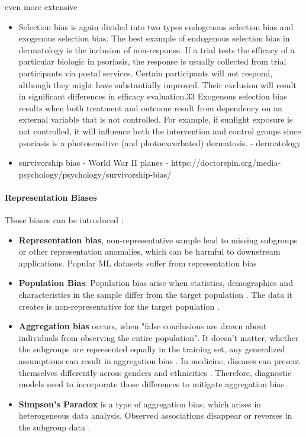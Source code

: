 \begin{refsection}
		even more extensive
		\begin{itemize}
			\item Selection bias is again divided into two types endogenous selection bias and exogenous selection bias. The best example of endogenous selection bias in dermatology is the inclusion of non-response. If a trial tests the efficacy of a particular biologic in psoriasis, the response is usually collected from trial participants via postal services. Certain participants will not respond, although they might have substantially improved. Their exclusion will result in significant differences in efficacy evaluation.33
			Exogenous selection bias results when both treatment and outcome result from dependency on an external variable that is not controlled. For example, if sunlight exposure is not controlled, it will influence both the intervention and control groups since psoriasis is a photosensitive (and photoexcerbated) dermatosis. \autocite{Chakraborty_2024} - dermatology
			
			
			\item survivorship bias - World War II planes \autocite{Silfwer_2017} - https://doctorspin.org/media-psychology/psychology/survivorship-bias/
		\end{itemize}
		
		\rawcitationend
		
		\paragraph{Representation Biases}
		
		Those biases can be introduced :
		\begin{itemize}
			\item \textbf{Representation bias}, non-representative sample lead to missing subgroups or other representation anomalies, which can be harmful to downstream applications. Popular \gls{ML} datasets suffer from representation bias \autocites{Mehrabi_2021}{M142_Shankar_2017}
			\item \textbf{Population Bias}. Population bias arise when statistics, demographics and characteristics in the sample differ from the target population \autocite{M120_Olteanu_2019}. The data it creates is non-representative for the target population \autocite{Mehrabi_2021}.
			\item \textbf{Aggregation bias} occurs, when "false conclusions are drawn about individuals from observing the entire population". It doesn't matter, whether the subgroups are represented equally in the training set, any generalized assumptions can result in aggregation bias \autocite{Mehrabi_2021}. In medicine, diseases can present themselves differently across genders and ethnicities \autocite{M144_Suresh_2021}. Therefore, diagnostic models need to incorporate those differences to mitigate aggregation bias \autocite{Mehrabi_2021}.
			\item \textbf{Simpson's Paradox} is a type of aggregation bias, which arises in heterogeneous data analysis. Observed associations disappear or reverses in the subgroup data \autocite{Mehrabi_2021}.
		\end{itemize}
		

\end{refsection}
